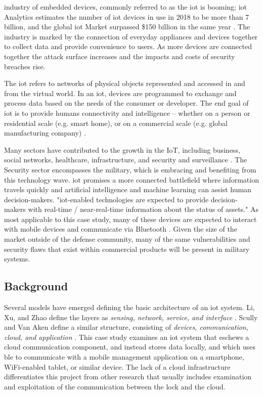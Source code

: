 \documentclass[conference]{IEEEtran}
\begin{document}
 industry of embedded devices, commonly referred to as the \gls{iot} is booming; \gls{iot} Analytics estimates the number of \gls{iot} devices in use in 2018 to be more than 7 billion, and the global \gls{iot} Market surpassed \$150 billion in the same year \cite{Scully2017}. The industry is marked by the connection of everyday appliances and devices together to collect data and provide convenience to users. As more devices are connected together the attack surface increases and the impacts and costs of security breaches rise.

\bigskip

The \gls{iot} refers to networks of physical objects represented and accessed in and from the virtual world. In an \gls{iot}, devices are programmed to exchange and process data based on the needs of the consumer or developer. The end goal of \gls{iot} is to provide humans connectivity and intelligence -- whether on a person or residential scale (e.g. smart home), or on a commercial scale (e.g. global manufacturing company) \cite{Li2015}. 

\bigskip

Many sectors have contributed to the growth in the IoT, including business, social networks, healthcare, infrastructure, and security and surveillance \cite{Li2015}. The Security sector encompasses the military, which is embracing and benefiting from this technology wave. \gls{iot} promises a more connected battlefield where information travels quickly and artificial intelligence and machine learning can assist human decision-makers. "\gls{iot}-enabled technologies are expected to provide decision-makers with real-time / near-real-time information about the status of assets." As most applicable to this case study, many of these devices are expected to interact with mobile devices and communicate via Bluetooth  \cite{Miller}. Given the size of the market outside of the defense community, many of the same vulnerabilities and security flaws that exist within commercial products will be present in military systems. 

\subsection{Background}

Several models have emerged defining the basic architecture of an \gls{iot} system. Li, Xu, and Zhao define the layers as \textit{sensing, network, service, and interface} \cite{Li2015}. Scully and Van Aken define a similar structure, consisting of \textit{devices, communication, cloud, and application}  \cite{Scully2017}. This case study examines an \gls{iot} system that eschews a cloud communication component, and instead stores data locally, and which uses \gls{ble} \cite{ZKTecoa} to communicate with a mobile management application on a smartphone, WiFi-enabled tablet, or similar device.  The lack of a cloud infrastructure differentiates this project from other research that usually includes examination and exploitation of the communication between the lock and the cloud. 
\end{document}
